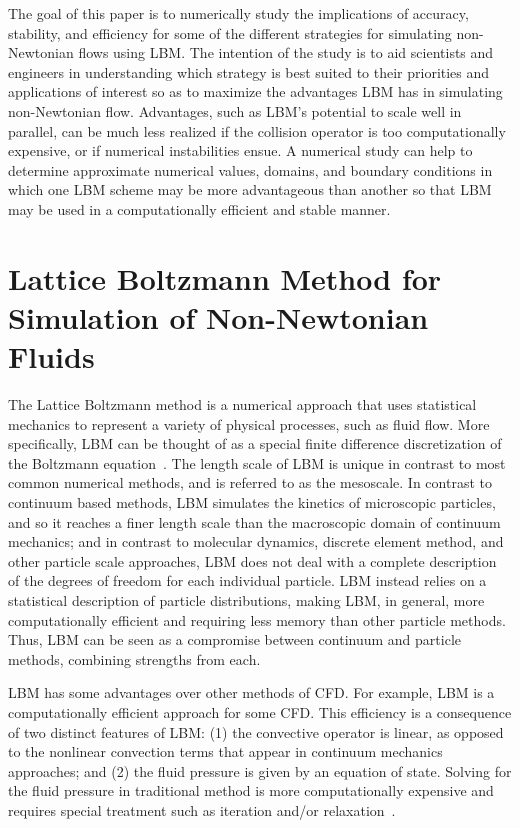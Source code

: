 \documentclass[pdftex,ms]{pittetd}
\begin{document}
The goal of this paper is to numerically study the implications of accuracy, stability, and efficiency for some of the different strategies for simulating non-Newtonian flows using LBM. The intention of the study is to aid scientists and engineers in understanding which strategy is best suited to their priorities and applications of interest so as to maximize the advantages LBM has in simulating non-Newtonian flow.
Advantages, such as LBM's potential to scale well in parallel, can be much less realized if the collision operator is too computationally expensive, or if numerical instabilities ensue.
A numerical study can help to determine approximate numerical values, domains, and boundary conditions in which one LBM scheme may be more advantageous than another so that LBM may be used in a computationally efficient and stable manner.


\section{Lattice Boltzmann Method for Simulation of Non-Newtonian Fluids} \label{sec:LBM}

The Lattice Boltzmann method is a numerical approach that uses statistical mechanics to represent a variety of physical processes, such as fluid flow.
More specifically, LBM can be thought of as a special finite difference discretization of the Boltzmann equation~\cite{chen1998lattice}.
The length scale of LBM is unique in contrast to most common numerical methods, and is referred to as the mesoscale.
In contrast to continuum based methods, LBM simulates the kinetics of microscopic particles, and so it reaches a finer length scale than the macroscopic domain of continuum mechanics; and in contrast to molecular dynamics, discrete element method, and other particle scale approaches, LBM does not deal with a complete description of the degrees of freedom for each individual particle.
LBM instead relies on a statistical description of particle distributions, making LBM, in general, more computationally efficient and requiring less memory than other particle methods.
Thus, LBM can be seen as a compromise between continuum and particle methods, combining strengths from each.

LBM has some advantages over other methods of CFD.
For example, LBM is a computationally efficient approach for some CFD.
This efficiency is a consequence of two distinct features of LBM: (1) the convective operator is linear, as opposed to the nonlinear convection terms that appear in continuum mechanics approaches; and (2) the fluid pressure is given by an equation of state.
Solving for the fluid pressure in traditional method is more computationally expensive and requires special treatment such as iteration and/or relaxation~\cite{chen1998lattice}.
\end{document}
